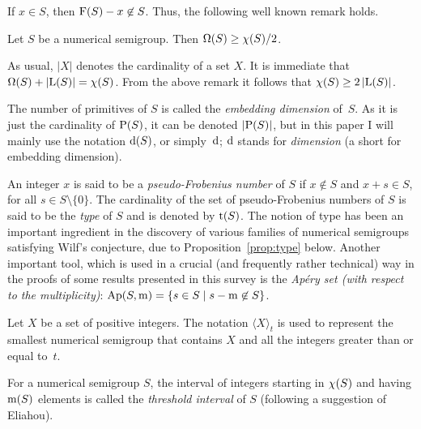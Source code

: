 If $x\in S$, then $\operatorname{F}(S)-x\not \in S$. Thus, the following well known remark holds.

\begin{remark}%
Let $S$ be a numerical semigroup. Then $\operatorname{\Omega}(S)\ge \operatorname{\chi}(S)/2$. 
\end{remark}

As usual, $\lvert X\rvert$ denotes the cardinality of a set $X$.
It is immediate that $\operatorname{\Omega}(S)+\left|\operatorname{L}(S)\right| =\operatorname{\chi}(S)$.
From the above remark it follows that $\operatorname{\chi}(S)\ge 2\left|\operatorname{L}(S)\right|$.

The number of primitives of $S$ is  called the \emph{embedding dimension} of~$S$. As it is just the cardinality of $\operatorname{P}(S)$, it can be denoted $\lvert \operatorname{P}(S)\rvert $, but in this paper I will mainly use the notation $\operatorname{d}(S)$, or simply~$\operatorname{d}$; $\operatorname{d}$ stands for \emph{dimension} (a short for embedding dimension). 

An integer $x$ is said to be a \emph{pseudo-Frobenius number} of $S$ if $x\not\in S$ and $x+s\in S$, for all $s\in S\setminus{\{0\}}$. The cardinality of the set of pseudo-Frobenius numbers of $S$ is said to be the \emph{type} of $S$ and is denoted by $\operatorname{t}(S)$. The notion of type has been an important ingredient in the discovery of various families of numerical semigroups satisfying Wilf's conjecture, due to Proposition~\ref{prop:type} below.
Another important tool, which is used in a crucial (and frequently rather technical) way in the proofs of some results presented in this survey is the \emph{Apéry set (with respect to the multiplicity)}: $\operatorname{Ap}(S,\operatorname{m})=\{s\in S\mid s-\operatorname{m}\not\in S\}$.

Let $X$ be a set of positive integers. The notation $\langle X\rangle_{t}$ is used to represent the smallest numerical semigroup that contains $X$ and all the integers greater than or equal to~$t$. 

For a numerical semigroup $S$, the interval of integers starting in $\operatorname{\chi}(S)$ and having $\operatorname{m}(S)$ elements is called the \emph{threshold interval} of $S$ (following a suggestion of Eliahou).

